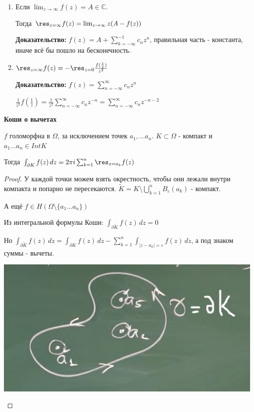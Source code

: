 \begin{properties}
\begin{enumerate}
        \item Если $\lim_{z \to \infty} f(z) = A \in \mathbb{C}$.
        
        Тогда $\res_{z = \infty} f(z) = \lim_{z \to \infty} z (A - f(z))$

        \textbf{Доказательство:} $f(z) = A + \sum_{k = -\infty}^{-1} c_nz^n$, правильная часть - константа,
        иначе всё бы пошло на бесконечность. 

        \item $\res_{z = \infty} f(z) = -\res_{z = 0} \frac{f(\frac{1}{z})}{z^2}$
        
        \textbf{Доказательство:} $f(z) = \sum_{n = -\infty}^{\infty} c_nz^n$

        $\frac{1}{z^2} f(\frac{1}{z}) = \frac{1}{z^2} \sum_{n = -\infty}^{\infty} c_nz^{-n} =
        \sum_{n = -\infty}^{\infty} c_nz^{-n - 2}$
    \end{enumerate}
\end{properties}

\begin{theorem}
    \textbf{Коши о вычетах}

    $f$ голоморфна в $\Omega$, за исключением точек $a_1, \ldots a_n$.
    $K \subset \Omega$ - компакт и $a_1 \ldots a_n \in Int K$

    Тогда $\int_{\partial K} f(z) \, dz = 2\pi i \sum_{k = 1}^n \res_{z = a_k} f(z)$ 
\end{theorem}

\begin{proof}

    У каждой точки можем взять окрестность, чтобы они лежали внутри компакта и
    попарно не пересекаются. $\widetilde{K} = K \setminus \bigcup_{k = 1}^n B_{\varepsilon} (a_k)$ - компакт.
    
    А ещё $f \in H(\Omega \setminus \{ a_1 \ldots a_n\} )$

    Из интегральной формулы Коши: $\int_{\partial \widetilde{K}} f(z) \, dz = 0$

    Но $\int_{\partial \widetilde{K}} f(z) \, dz = \int_{\partial K} f(z) \, dz - \sum_{k = 1}^n \int_{|z - a_k| = \varepsilon} f(z) \, dz$, а 
    под знаком суммы - вычеты.

    
    \begin{center}
        \includegraphics{assets/04-functions-of-complex-variables/koshi-theorem-for-deductions.png}
    \end{center}
\end{proof}

